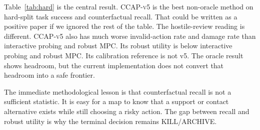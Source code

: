 \documentclass{article}
\newcommand{\method}{\textsc{CCAP-v5}}
\newcommand{\terminal}{\textsc{KILL/ARCHIVE}}
\begin{document}
\begin{table}[t]
\centering
\small
{}
\caption{Hard aggregate over low-signal and combined counterfactual stress splits. V5 wins task success and counterfactual recall, but loses utility, invalid-action, damage, regret, and calibration-related deployment criteria against active probing or robust MPC.}
\label{tab:hard}
\end{table}


Table~\ref{tab:hard} is the central result. \method{} is the best non-oracle method on hard-split task success and counterfactual recall. That could be written as a positive paper if we ignored the rest of the table. The hostile-review reading is different. \method{} also has much worse invalid-action rate and damage rate than interactive probing and robust MPC. Its robust utility is below interactive probing and robust MPC. Its calibration reference is not v5. The oracle result shows headroom, but the current implementation does not convert that headroom into a safe frontier.

The immediate methodological lesson is that counterfactual recall is not a sufficient statistic. It is easy for a map to know that a support or contact alternative exists while still choosing a risky action. The gap between recall and robust utility is why the terminal decision remains \terminal{}.
\end{document}
